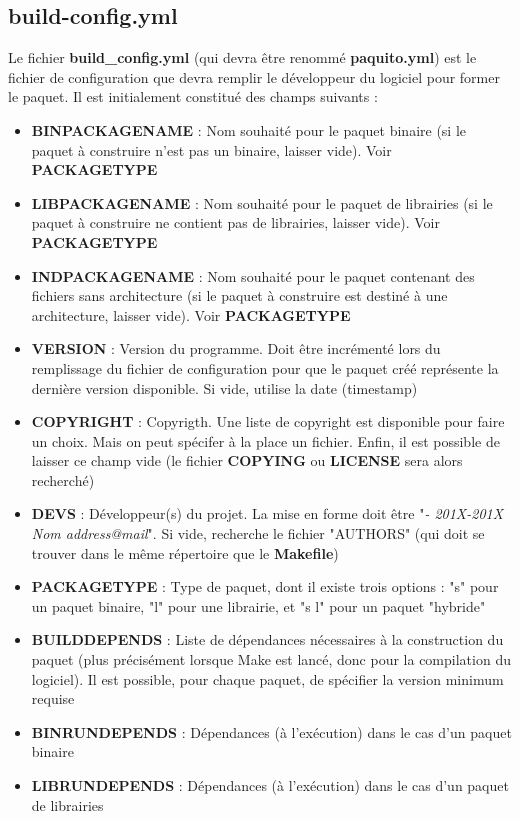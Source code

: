 \documentclass[12pt,a4paper]{article}
\begin{document}
\subsection{build-config.yml}
Le fichier \textbf{build\_config.yml} (qui devra être renommé \textbf{paquito.yml}) est le fichier de configuration que devra remplir le développeur du logiciel pour former le paquet. Il est initialement constitué des champs suivants :
\begin{itemize}
	\item \textbf{BINPACKAGENAME} : Nom souhaité pour le paquet binaire (si le paquet à construire n'est pas un binaire, laisser vide). Voir \textbf{PACKAGETYPE}
	\item \textbf{LIBPACKAGENAME} : Nom souhaité pour le paquet de librairies (si le paquet à construire ne contient pas de librairies, laisser vide). Voir \textbf{PACKAGETYPE}
	\item \textbf{INDPACKAGENAME} : Nom souhaité pour le paquet contenant des fichiers sans architecture (si le paquet à construire est destiné à une architecture, laisser vide). Voir \textbf{PACKAGETYPE}
	\item \textbf{VERSION} : Version du programme. Doit être incrémenté lors du remplissage du fichier de configuration pour que le paquet créé représente la dernière version disponible. Si vide, utilise la date (timestamp)
	\item \textbf{COPYRIGHT} : Copyrigth. Une liste de copyright est disponible pour faire un choix. Mais on peut spécifer à la place un fichier. Enfin, il est possible de laisser ce champ vide (le fichier \textbf{COPYING} ou \textbf{LICENSE} sera alors recherché)
	\item \textbf{DEVS} : Développeur(s) du projet. La mise en forme doit être "\textit{- 201X-201X Nom address@mail}". Si vide, recherche le fichier "AUTHORS" (qui doit se trouver dans le même répertoire que le \textbf{Makefile})
	\item \textbf{PACKAGETYPE} : Type de paquet, dont il existe trois options : "s" pour un paquet binaire, "l" pour une librairie, et "s l" pour un paquet "hybride"
	\item \textbf{BUILDDEPENDS} : Liste de dépendances nécessaires à la construction du paquet (plus précisément lorsque Make est lancé, donc pour la compilation du logiciel). Il est possible, pour chaque paquet, de spécifier la version minimum requise
	\item \textbf{BINRUNDEPENDS} : Dépendances (à l'exécution) dans le cas d'un paquet binaire
	\item \textbf{LIBRUNDEPENDS} : Dépendances (à l'exécution) dans le cas d'un paquet de librairies

\end{itemize}
\end{document}
